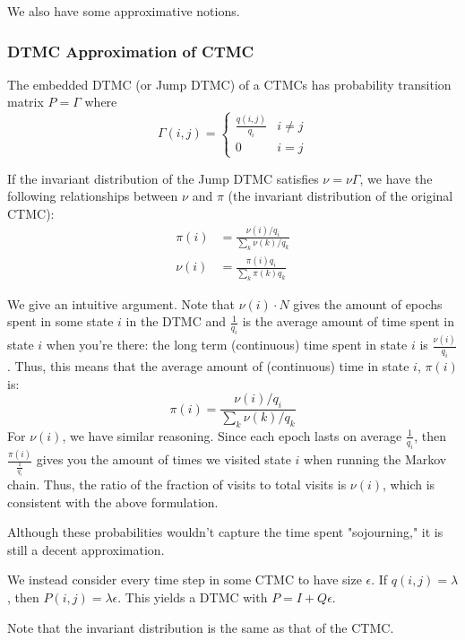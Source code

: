 We also have some approximative notions.

\subsubsection{DTMC Approximation of CTMC}

\begin{definition}
   The embedded DTMC (or Jump DTMC) of a CTMCs has probability transition matrix $P = \Gamma$ where
   \[ \Gamma(i, j) = \begin{cases}
        \frac{q(i, j)}{q_i} & i \neq j \\
        0 & i = j
   \end{cases} \]
\end{definition}

\begin{theorem}
   If the invariant distribution of the Jump DTMC satisfies $\nu = \nu \Gamma$, we have the following relationships between $\nu$ and $\pi$ (the invariant distribution of
   the original CTMC):
   \begin{align*}
       \pi(i) &= \frac{\nu(i)/q_i}{\sum_k \nu(k)/q_k} \\
       \nu(i) &= \frac{\pi(i) q_i}{\sum_k \pi(k) q_k}
   \end{align*}

    \begin{proof*}
        We give an intuitive argument.
        Note that $\nu(i) \cdot N$ gives the amount of epochs spent in some state $i$ in the DTMC and $\frac{1}{q_i}$ is the average amount of time
        spent in state $i$ when you're there: the long term (continuous) time spent in state $i$ is $\frac{\nu(i)}{q_i}$. Thus, this means that the average amount of
        (continuous) time in state $i$, $\pi(i)$ is:
        \[ \pi(i) = \frac{\nu(i)/q_i}{\sum_k \nu(k)/q_k} \]
        For $\nu(i)$, we have similar reasoning. Since each epoch lasts on average $\frac{1}{q_i}$, then $\frac{\pi(i)}{\frac{1}{q_i}}$ gives you the amount
        of times we visited state $i$ when running the Markov chain. Thus, the ratio of the fraction of visits to total visits is $\nu(i)$, which is consistent with the above formulation.
    \end{proof*}
\end{theorem}

Although these
probabilities wouldn't capture the time spent "sojourning," it is still a decent approximation.

\begin{definition}
    We instead consider every time step in some CTMC to have size $\epsilon$. If $q(i, j) = \lambda$, then $P(i, j) = \lambda \epsilon$.
    This yields a DTMC with $P = I + Q\epsilon$.

    Note that the invariant distribution is the same as that of the CTMC.
\end{definition}

